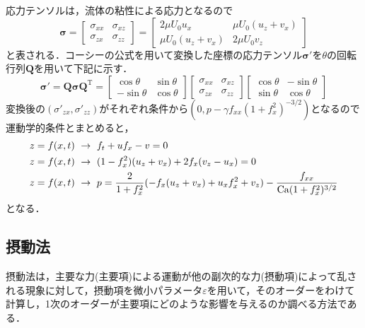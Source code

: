 \documentclass[autodetect-engine,dvipdfmx-if-dvi,ja=standard,a4paper,11pt]{bxjsarticle} %
\begin{document}
応力テンソルは，流体の粘性による応力となるので
\begin{equation}
{\boldsymbol \sigma} = \left[
\begin{array}{ccc}
\sigma_{xx} & \sigma_{xz}\\
\sigma_{zx} & \sigma_{zz}
\end{array}
\right]= \left[
\begin{array}{ccc}
2\mu U_0u_x & \mu U_0\left(u_z+v_x\right)\\
\mu U_0\left(u_z+v_x\right) & 2\mu U_0v_z
\end{array}
\right]
\end{equation}
と表される．コーシーの公式を用いて変換した座標の応力テンソル${\boldsymbol \sigma'}$を$\theta$の回転行列${\boldsymbol Q}$を用いて下記に示す．
\begin{equation}
{\boldsymbol \sigma'}={\boldsymbol Q}{\boldsymbol\sigma}{\boldsymbol Q^{\mathrm{T}}}=\left[
\begin{array}{ccc}
\cos\theta & \sin\theta\\
-\sin\theta & \cos\theta
\end{array}
\right]\left[
\begin{array}{ccc}
\sigma_{xx} & \sigma_{xz}\\
\sigma_{zx} & \sigma_{zz}
\end{array}
\right]\left[
\begin{array}{ccc}
\cos\theta & -\sin\theta\\
\sin\theta & \cos\theta
\end{array}
\right]
\end{equation}
変換後の$(\sigma'_{zx},\sigma'_{zz})$がそれぞれ条件から$(0,p-\gamma f_{xx}(1+f_x^2)^{-3/2})$となるので運動学的条件とまとめると，
\begin{subequations}
\begin{align}
z&=f(x,t)\ \rightarrow\ f_t+uf_x-v=0\label{eq:abc1}\\
z&=f(x,t)\ \rightarrow\ (1-f_x^2)(u_z+v_x)+2f_x(v_z-u_x)=0\label{eq:abc2}\\
z&=f(x,t)\ \rightarrow\ p=\frac{2}{1+f_x^2}(-f_x(u_z+v_x)+u_xf_x^2+v_z)-\frac{f_{xx}}{{\rm Ca}(1+f_x^2)^{3/2}}\label{eq:abc3}
\end{align}
\label{eq:abc}
\end{subequations}
となる．
\subsection{摂動法}
摂動法は，主要な力(主要項)による運動が他の副次的な力(摂動項)によって乱される現象に対して，摂動項を微小パラメータ$\varepsilon$を用いて，そのオーダーをわけて計算し，1次のオーダーが主要項にどのような影響を与えるのか調べる方法である．
\end{document}
